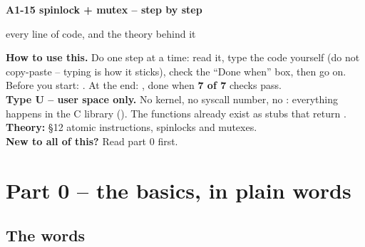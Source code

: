 \documentclass[11pt]{report}
\begin{document}
{\centering
  {\LARGE\bfseries A1-15 spinlock + mutex -- step by step\par}
  \vspace{4pt}
  {\large every line of code, and the theory behind it\par}
  \vspace{8pt}
}

\begin{infobox}
\textbf{How to use this.} Do one step at a time: read it, type the code yourself (do not copy-paste --
typing is how it sticks), check the ``Done when'' box, then go on. Before you start:
. At the end: , done when \textbf{7 of 7} checks pass.\\[3pt]
\textbf{Type U -- user space only.} No kernel, no syscall number, no : everything happens in
the C library (). The functions already exist as stubs that return .\\[3pt]
\textbf{Theory:}  \S12 atomic instructions, spinlocks and mutexes.\\[3pt]
\textbf{New to all of this?} Read part 0 first.
\end{infobox}

\section*{Part 0 -- the basics, in plain words}

\subsection*{The words}
\end{document}
